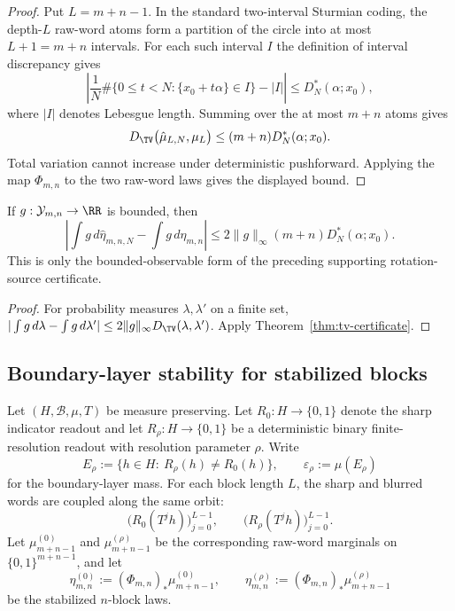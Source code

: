 \begin{proof}
Put $L=m+n-1$.  In the standard two-interval Sturmian coding, the depth-$L$
raw-word atoms form a partition of the circle into at most $L+1=m+n$
intervals.  For each such interval $I$ the definition of interval discrepancy
gives
\[
\left|
\frac1N\#\{0\le t<N:\{x_0+t\alpha\}\in I\}-|I|
\right|
\le D_N^*(\alpha;x_0),
\]
where $|I|$ denotes Lebesgue length.  Summing over the at most $m+n$ atoms gives
\[
D_{\TV}\bigl(\hat{\mu}_{L,N},\mu_L\bigr)
\le (m+n)D_N^*(\alpha;x_0).
\]
Total variation cannot increase under deterministic pushforward.  Applying
the map $\Phi_{m,n}$ to the two raw-word laws gives the displayed bound.
\end{proof}

\begin{corollary}\label{cor:observable-certificate}
If $g:\mathcal Y_{m,n}\to\RR$ is bounded, then
\[
\left|
\int g\,d\hat{\eta}_{m,n,N}-\int g\,d\eta_{m,n}
\right|
\le
2\|g\|_\infty (m+n)D_N^*(\alpha;x_0).
\]
This is only the bounded-observable form of the preceding supporting
rotation-source certificate.
\end{corollary}

\begin{proof}
For probability measures $\lambda,\lambda'$ on a finite set,
$|\int g\,d\lambda-\int g\,d\lambda'|
\le 2\|g\|_\infty D_{\TV}(\lambda,\lambda')$.  Apply
Theorem~\ref{thm:tv-certificate}.
\end{proof}

\subsection{Boundary-layer stability for stabilized blocks}\label{sec:fp:tv:boundary}

Let $(H,\mathcal B,\mu,T)$ be measure preserving. Let
$R_0:H\to\{0,1\}$ denote the sharp indicator readout and let
$R_\rho:H\to\{0,1\}$ be a deterministic binary finite-resolution readout with
resolution parameter $\rho$. Write
\[
E_\rho:=\{h\in H:\ R_\rho(h)\neq R_0(h)\},
\qquad
\varepsilon_\rho
:=
\mu(E_\rho)
\]
for the boundary-layer mass. For each block length $L$, the sharp and blurred
words are coupled along the same orbit:
\[
\bigl(R_0(T^j h)\bigr)_{j=0}^{L-1},
\qquad
\bigl(R_\rho(T^j h)\bigr)_{j=0}^{L-1}.
\]
Let $\mu_{m+n-1}^{(0)}$ and $\mu_{m+n-1}^{(\rho)}$ be the corresponding
raw-word marginals on $\{0,1\}^{m+n-1}$, and let
\[
\eta_{m,n}^{(0)}:=(\Phi_{m,n})_*\mu_{m+n-1}^{(0)},
\qquad
\eta_{m,n}^{(\rho)}:=(\Phi_{m,n})_*\mu_{m+n-1}^{(\rho)}
\]
be the stabilized $n$-block laws.

